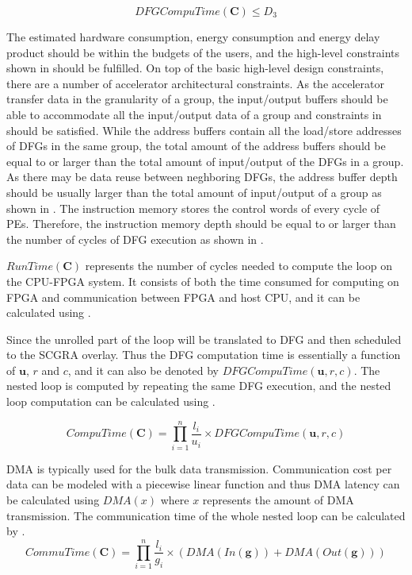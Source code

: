 \begin{equation} \label{eq:constraints4}
DFGCompuTime(\bm{C}) \leq D_3
\end{equation}

The estimated hardware consumption, energy consumption and energy delay product should be within the budgets of the users, and the high-level constraints shown in  should be fulfilled. On top of the basic high-level design constraints, there are a number of accelerator architectural constraints. As the accelerator transfer data in the granularity of a group, the input/output buffers should be able to accommodate all the input/output data of a group and constraints in  should be satisfied. While the address buffers contain all the load/store addresses of DFGs in the same group, the total amount of the address buffers should be equal to or larger than the total amount of input/output of the DFGs in a group. As there may be data reuse between neghboring DFGs, the address buffer depth should be usually larger than the total amount of input/output of a group as shown in . The instruction memory stores the control words of every cycle of PEs. Therefore, the instruction memory depth should be equal to or larger than the number of cycles of DFG execution as shown in .

$RunTime(\bm{C})$ represents the number of cycles needed to compute the loop on the CPU-FPGA system. It consists of both the time consumed for computing on FPGA and communication between FPGA and host CPU, and it can be calculated using .

Since the unrolled part of the loop will be translated to DFG and then scheduled to the SCGRA overlay. Thus the DFG computation time is essentially a function of $\mathbf{u}$, $r$ and $c$, and it can also be denoted by $DFGCompuTime(\mathbf{u},r,c)$. The nested loop is computed by repeating the same DFG execution, and the nested loop computation can be calculated using .

\begin{equation} \label{eq:loopexetime}
    CompuTime(\bm{C})=\displaystyle \prod_{i=1}^{n} \frac{l_i}{u_i} \times DFGCompuTime(\mathbf{u},r,c)
\end{equation}

DMA is typically used for the bulk data transmission. Communication cost per data can be modeled with a piecewise linear function and thus DMA latency can be calculated using $DMA(x)$ where $x$ represents the amount of DMA transmission. The communication time of the whole nested loop can be calculated by .
\begin{equation} \label{eq:commu}
    CommuTime(\bm{C})=\displaystyle \prod_{i=1}^{n} \frac{l_i}{g_i} \times 
    (DMA(In(\mathbf{g}))+DMA(Out(\mathbf{g})))
\end{equation}

